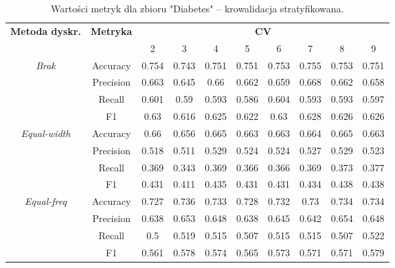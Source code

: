 \begin{table}[H]
\center
    \caption{Wartości metryk dla zbioru "Diabetes" -- krowalidacja stratyfikowana.}
    \begin{tabular}{|c|c|c|c|c|c|c|c|c|c|}
        \hline
        \multirow{2}{*}{\textbf{Metoda dyskr.}} & \multirow{2}{*}{\textbf{Metryka}} & \multicolumn{8}{|c|}{\textbf{CV}} \\ \cline{3-10}
                        &  & 2 & 3 & 4 & 5 & 6 & 7 & 8 & 9 \\ \hline
        \multirow{4}{*}{\textit{Brak}}  & Accuracy & 0.754 & 0.743 & 0.751 & 0.751 & 0.753 & 0.755 & 0.753 & 0.751 \\ \cline{2-10}
                                         & Precision & 0.663 & 0.645 & 0.66 & 0.662 & 0.659 & 0.668 & 0.662 & 0.658 \\ \cline{2-10}
                                         & Recall & 0.601 & 0.59 & 0.593 & 0.586 & 0.604 & 0.593 & 0.593 & 0.597 \\ \cline{2-10}
                                         & F1 & 0.63 & 0.616 & 0.625 & 0.622 & 0.63 & 0.628 & 0.626 & 0.626 \\ \hline \hline


        \multirow{4}{*}{\textit{Equal-width}}  & Accuracy & 0.66 & 0.656 & 0.665 & 0.663 & 0.663 & 0.664 & 0.665 & 0.663 \\ \cline{2-10}
                                             & Precision & 0.518 & 0.511 & 0.529 & 0.524 & 0.524 & 0.527 & 0.529 & 0.523 \\ \cline{2-10}
                                             & Recall & 0.369 & 0.343 & 0.369 & 0.366 & 0.366 & 0.369 & 0.373 & 0.377 \\ \cline{2-10}
                                             & F1 & 0.431 & 0.411 & 0.435 & 0.431 & 0.431 & 0.434 & 0.438 & 0.438 \\ \hline \hline


        \multirow{4}{*}{\textit{Equal-freq}}  & Accuracy & 0.727 & 0.736 & 0.733 & 0.728 & 0.732 & 0.73 & 0.734 & 0.734 \\ \cline{2-10}
                                             & Precision & 0.638 & 0.653 & 0.648 & 0.638 & 0.645 & 0.642 & 0.654 & 0.648 \\ \cline{2-10}
                                             & Recall & 0.5 & 0.519 & 0.515 & 0.507 & 0.515 & 0.515 & 0.507 & 0.522 \\ \cline{2-10}
                                             & F1 & 0.561 & 0.578 & 0.574 & 0.565 & 0.573 & 0.571 & 0.571 & 0.579 \\ \hline \hline



\end{tabular}
\end{table}
